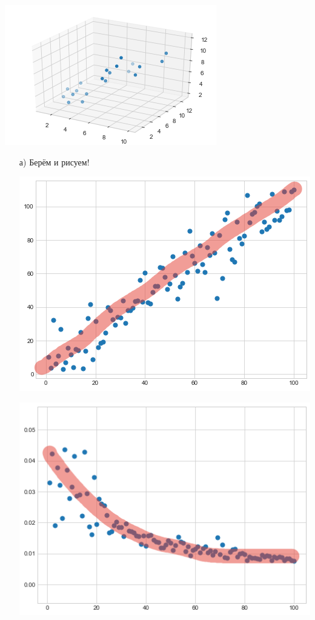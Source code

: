 \documentclass[12pt, a4paper, oneside]{article}
\theoremstyle{plain} %
\theoremstyle{definition}
\begin{document}
\begin{problem}{ }
\begin{center}
	\includegraphics[scale=0.8]{regr_pic_5.png}
\end{center}
\end{problem}

\begin{solution}
	\begin{enumerate}	
		\item[а)] Берём и рисуем! 
		
		\begin{minipage}[t]{0.45\textwidth}
			\includegraphics[scale=0.4]{regr_pic_1_ans.png}
		\end{minipage}
		\hfill
		\begin{minipage}[t]{0.45\textwidth}
			\includegraphics[scale=0.4]{regr_pic_2_ans.png}
		\end{minipage}
		

\end{enumerate}
\end{solution}
\end{document}
